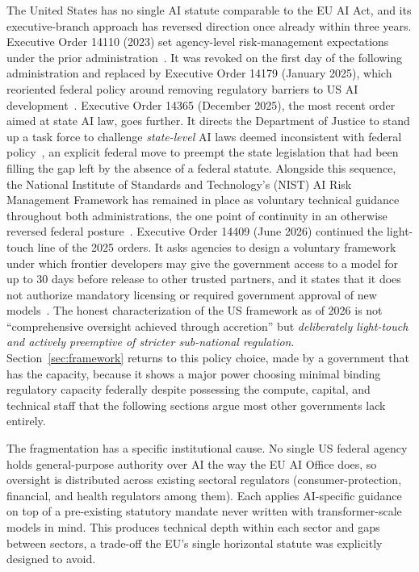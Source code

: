 \documentclass{ieeeaccess}
\begin{document}
The United States has no single AI statute comparable to the EU AI Act, and its executive-branch approach has reversed direction once already within three years. Executive Order 14110 (2023) set agency-level risk-management expectations under the prior administration~\cite{biden2023eo14110}. It was revoked on the first day of the following administration and replaced by Executive Order 14179 (January 2025), which reoriented federal policy around removing regulatory barriers to US AI development~\cite{trump2025eo14179}. Executive Order 14365 (December 2025), the most recent order aimed at state AI law, goes further. It directs the Department of Justice to stand up a task force to challenge \emph{state-level} AI laws deemed inconsistent with federal policy~\cite{trump2025eo14365},
an explicit federal move to preempt the state legislation that had been filling the gap left by the absence of a federal statute. Alongside this sequence, the National Institute of Standards and Technology's (NIST) AI Risk Management Framework has remained in place as voluntary technical guidance throughout both administrations, the one point of continuity in an otherwise reversed federal posture~\cite{nist2023airmf}.
Executive Order 14409 (June 2026) continued the light-touch line of the 2025 orders. It asks agencies to design a voluntary framework under which frontier developers may give the government access to a model for up to 30 days before release to other trusted partners, and it states that it does not authorize mandatory licensing or required government approval of new models~\cite{trump2026eo14409}.
The honest characterization of the US framework as of 2026 is not ``comprehensive oversight achieved through accretion'' but \emph{deliberately light-touch and actively preemptive of stricter sub-national regulation}. Section~\ref{sec:framework} returns to this policy choice, made by a government that has the capacity, because it shows a major power choosing minimal binding regulatory capacity federally despite possessing the compute, capital, and technical staff that the following sections argue most other governments lack entirely.

The fragmentation has a specific institutional cause. No single US federal agency holds general-purpose authority over AI the way the EU AI Office does, so oversight is distributed across existing sectoral regulators (consumer-protection, financial, and health regulators among them). Each applies AI-specific guidance on top of a pre-existing statutory mandate never written with transformer-scale models in mind.
This produces technical depth within each sector and gaps between sectors, a trade-off the EU's single horizontal statute was explicitly designed to avoid.
\end{document}
